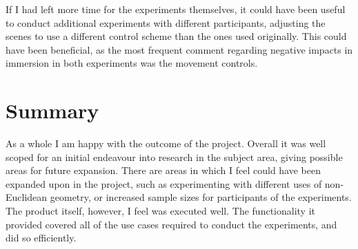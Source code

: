 		If I had left more time for the experiments themselves, it could have been useful to conduct additional experiments with different participants, adjusting the scenes to use a different control scheme than the ones used originally.
		This could have been beneficial, as the most frequent comment regarding negative impacts in immersion in both experiments was the movement controls.

	\section{Summary}

		As a whole I am happy with the outcome of the project.
		Overall it was well scoped for an initial endeavour into research in the subject area, giving possible areas for future expansion.
		There are areas in which I feel could have been expanded upon in the project, such as experimenting with different uses of non-Euclidean geometry, or increased sample sizes for participants of the experiments.
		The product itself, however, I feel was executed well.
		The functionality it provided covered all of the use cases required to conduct the experiments, and did so efficiently.

